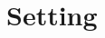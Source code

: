 \documentclass[10pt]{article}
\newcommand{\cL}{\mathcal{L}}
\renewcommand{\d}{\mathrm{d}}
\newcommand{\e}{\mathrm{e}}
\newcommand{\uonetilde}{\widetilde{u}_{1,\beta}^{h_0,h_1}}
\newcommand{\uone}{u_{1,\beta}^{h_0,h_1}}
\newcommand{\utwo}{u_{2,\beta}^{h_0,h_1}}
\newcommand{\utwotilde}{\widetilde{u}_{2,\beta}^{h_0,h_1}}
\newcommand{\lambdaone}{\lambda_{1,\beta}^{h_0,h_1}}
\newcommand{\1}{\mathbbm 1}
\begin{document}


    \tableofcontents

    \section{Setting}
\end{document}
